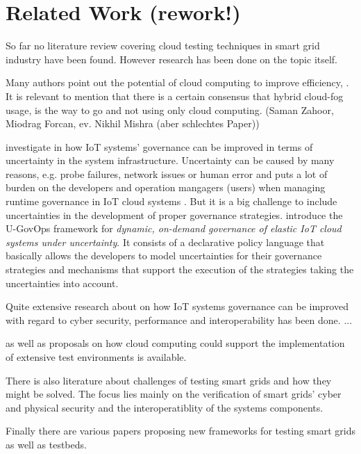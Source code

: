 \section{Related Work (rework!)}
So far no literature review covering cloud testing techniques in smart grid industry have been found. However research has been done on the topic itself.

Many authors point out the potential of cloud computing to improve efficiency, . It is relevant to mention that there is a certain consensus that hybrid cloud-fog usage, is the way to go and not using only cloud computing. (Saman Zahoor, Miodrag Forcan, ev. Nikhil Mishra (aber schlechtes Paper))

\citeauthor{7396147} investigate in how IoT systems' governance can be improved in terms of uncertainty in the system infrastructure. Uncertainty can be caused by many reasons, e.g. probe failures, network issues or human error and puts a lot of burden on the developers and operation mangagers (users) when managing runtime governance in IoT cloud systems \cite{7396147}. But it is a big challenge to include uncertainties in the development of proper governance strategies. \citeauthor{7396147} introduce the U-GovOps framework for \textit{dynamic, on-demand governance of elastic IoT cloud systems under uncertainty}. It consists of a declarative policy language that basically allows the developers to model uncertainties for their governance strategies and mechanisms that support the execution of the strategies taking the uncertainties into account.

Quite extensive research about on how IoT systems governance can be improved with regard to cyber security, performance and interoperability has been done. ...


as well as proposals on how cloud computing could support the implementation of extensive test environments is available. 

There is also literature about challenges of testing smart grids and how they might be solved. The focus lies mainly on the verification of smart grids' cyber and physical security and the interoperatiblity of the systems components.

Finally there are various papers proposing new frameworks for testing smart grids as well as testbeds.
